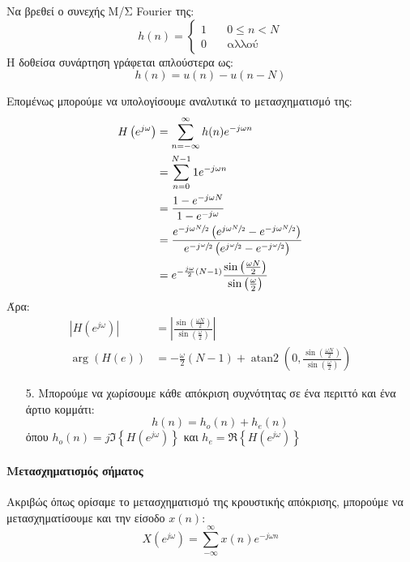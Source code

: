 \documentclass[11pt,a4paper,notitlepage,fleqn]{article}
\begin{document}
\begin{exercise}
	Να βρεθεί ο συνεχής Μ/Σ Fourier της:
	\[
	h(n) = \begin{cases}
	1 & \quad 0 \leq n < N\\
	0 & \quad \text{αλλού}
	\end{cases}
	\]
	\tcblower
	Η δοθείσα συνάρτηση γράφεται απλούστερα ως:
	\[
	h(n) = u(n) - u(n-N)
	\]
	
	Επομένως μπορούμε να υπολογίσουμε αναλυτικά το μετασχηματισμό της:
	\begin{align*}
		H\left(e^{j\omega }\right)
		&= \sum_{n=-\infty}^{\infty} h(n) e^{-j\omega n}
		\\ &= \sum_{n=0}^{N-1} 1 e^{-j\omega n}
		\\ &= \frac{1-e^{-j\omega N}}{1-e^{-j\omega }}
		\\ &= \frac
		{
			e^{-j\omega \sfrac{N}{2} } 
			\left(
				e^{j\omega \sfrac{N}{2} }-e^{-j\omega \sfrac{N}{2} }
			\right)
		}
		{ 
			e^{-j\sfrac{\omega }{2} }  
			\left( e^{j\sfrac{\omega }{2}  }
			-e^{-j\sfrac{\omega }{2} 	}\right)
		}
	\\ &= e^{-\frac{j\omega }{2} (N-1)}	\frac{\sin\left(\frac{\omega N}{2}\right)}{\sin\left(\frac{\omega}{2}\right)}
	\end{align*}
	Άρα:
	\begin{align*}
		\left|H\left(e^{j\omega }\right)\right|
		 &= \left|
		\frac{\sin\left(\frac{\omega N}{2}\right)}{\sin\left(\frac{\omega}{2}\right)}
		\right|
		\\
		\arg\left(H\left(e\right)\right) &= -\frac{\omega}{2}(N-1) + \mathop{atan2}\left(0, \frac{\sin\left(\frac{\omega N}{2}\right)}{\sin\left(\frac{\omega}{2}\right)}\right)
	\end{align*}
\end{exercise}

\begin{enumerate}
	\item[5.]
	Μπορούμε να χωρίσουμε κάθε απόκριση συχνότητας σε ένα περιττό και ένα άρτιο κομμάτι:
	\[
	h(n) = h_o(n) + h_e(n)
	\]
	όπου \( h_o(n) = j\Im \left\lbrace H\left(e^{j\omega }\right)\right\rbrace \)
	και \( h_e = \Re\left\lbrace H\left(e^{j\omega }\right) \right\rbrace \)
\end{enumerate}

\paragraph{Μετασχηματισμός σήματος}
Ακριβώς όπως ορίσαμε το μετασχηματισμό της κρουστικής απόκρισης, μπορούμε να μετασχηματίσουμε
και την είσοδο \( x(n) \):
\[
X\left(e^{j\omega }\right) = \sum_{-\infty}^{\infty} x(n)e^{-j\omega n}
\]
\end{document}
